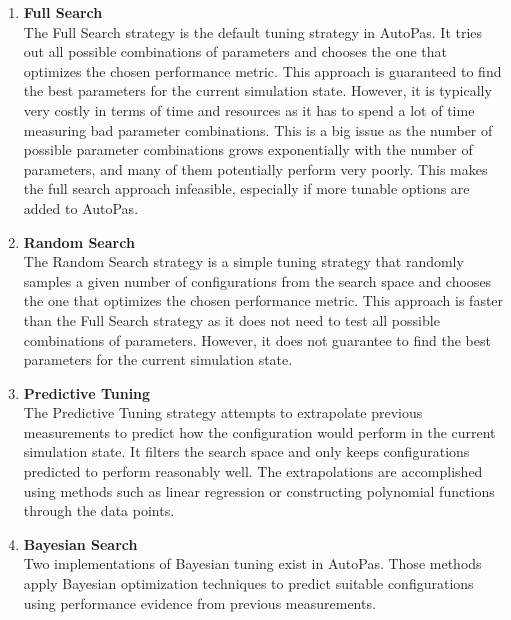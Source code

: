 \begin{enumerate}
      \item \textbf{Full Search} \\
            The Full Search strategy is the default tuning strategy in AutoPas. It tries out all possible combinations of parameters and chooses the one that optimizes the chosen performance metric. This approach is guaranteed to find the best parameters for the current simulation state. However, it is typically very costly in terms of time and resources as it has to spend a lot of time measuring bad parameter combinations. This is a big issue as the number of possible parameter combinations grows exponentially with the number of parameters, and many of them potentially perform very poorly. This makes the full search approach infeasible, especially if more tunable options are added to AutoPas.

      \item \textbf{Random Search} \\
            The Random Search strategy is a simple tuning strategy that randomly samples a given number of configurations from the search space and chooses the one that optimizes the chosen performance metric. This approach is faster than the Full Search strategy as it does not need to test all possible combinations of parameters. However, it does not guarantee to find the best parameters for the current simulation state.

      \item \textbf{Predictive Tuning} \\
            The Predictive Tuning strategy attempts to extrapolate previous measurements to predict how the configuration would perform in the current simulation state. It filters the search space and only keeps configurations predicted to perform reasonably well. The extrapolations are accomplished using methods such as linear regression or constructing polynomial functions through the data points.

      \item \textbf{Bayesian Search} \\
            Two implementations of Bayesian tuning exist in AutoPas. Those methods apply Bayesian optimization techniques to predict suitable configurations using performance evidence from previous measurements.


\end{enumerate}
